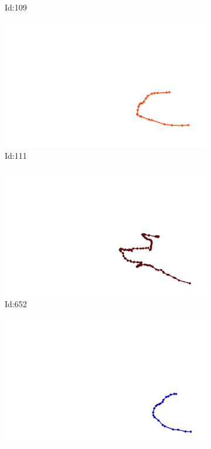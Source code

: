 \documentclass[12pt,twoside]{report}
\begin{document}
\begin{figure}
\begin{subfigure}[b]{0.20\textwidth}
\caption{Id:109}
\end{subfigure}
\begin{subfigure}[b]{0.20\textwidth}
\centering
\includegraphics[width=\textwidth]{../../trajectories/111.png}
\caption{Id:111}
\end{subfigure}
\begin{subfigure}[b]{0.20\textwidth}
\centering
\includegraphics[width=\textwidth]{../../trajectories/652.png}
\caption{Id:652}
\end{subfigure}
\begin{subfigure}[b]{0.20\textwidth}
\centering
\includegraphics[width=\textwidth]{../../trajectories/714.png}

\end{subfigure}
\end{figure}
\end{document}
